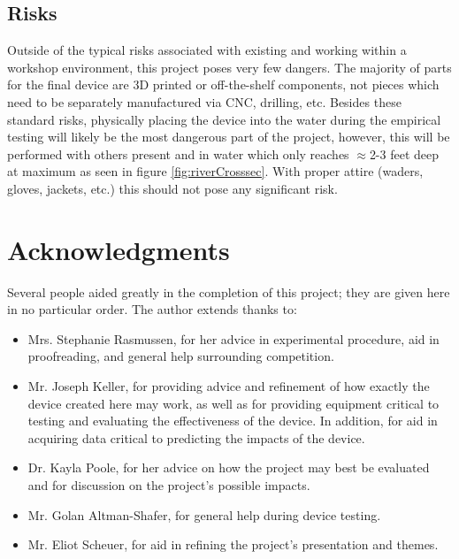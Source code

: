 \documentclass[fleqn,10pt]{SelfArx} %
\begin{document}
	\subsection{Risks}
	Outside of the typical risks associated with existing and working within a workshop environment, this project poses very few dangers. The majority of parts for the final device are 3D printed or off-the-shelf components, not pieces which need to be separately manufactured via CNC, drilling, etc. Besides these standard risks, physically placing the device into the water during the empirical testing will likely be the most dangerous part of the project, however, this will be performed with others present and in water which only reaches $\approx$2-3 feet deep at maximum as seen in figure \ref{fig:riverCrosssec}. With proper attire (waders, gloves, jackets, etc.) this should not pose any significant risk.
	
	
	\section*{Acknowledgments} %
	Several people aided greatly in the completion of this project; they are given here in no particular order. The author extends thanks to:
	\begin{itemize}
		\item Mrs. Stephanie Rasmussen, for her advice in experimental procedure, aid in proofreading, and general help surrounding competition.
		\item Mr. Joseph Keller, for providing advice and refinement of how exactly the device created here may work, as well as for providing equipment critical to testing and evaluating the effectiveness of the device. In addition, for aid in acquiring data critical to predicting the impacts of the device.
		\item Dr. Kayla Poole, for her advice on how the project may best be evaluated and for discussion on the project's possible impacts.
		\item Mr. Golan Altman-Shafer, for general help during device testing.
		\item Mr. Eliot Scheuer, for aid in refining the project's presentation and themes.
	\end{itemize}
	
	
	
	
	\nocite{*}
	
	
	
\end{document}
